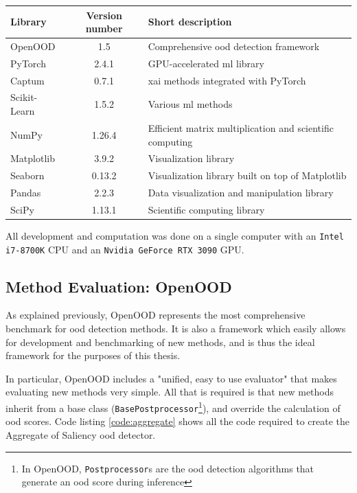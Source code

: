 \documentclass[UKenglish]{uiomasterthesis} %
\theoremstyle{definition}
\begin{document}
\begin{center}
    \begin{tabular}{ |l|c|l| } 
    \hline
    Library & Version number & Short description \\
    \hline
    OpenOOD & 1.5 & Comprehensive \ac{ood} detection framework \\ 
    PyTorch & 2.4.1 & GPU-accelerated \ac{ml} library \\ 
    Captum & 0.7.1 & \ac{xai} methods integrated with PyTorch \\ 
    Scikit-Learn & 1.5.2 & Various \ac{ml} methods \\ 
    NumPy & 1.26.4 & Efficient matrix multiplication and scientific computing \\ 
    Matplotlib & 3.9.2  & Visualization library \\ 
    Seaborn & 0.13.2 & Visualization library built on top of Matplotlib \\
    Pandas & 2.2.3 & Data visualization and manipulation library \\
    SciPy & 1.13.1 & Scientific computing library \\
    \hline
    \end{tabular}
\end{center}

All development and computation was done on a single computer with an \texttt{Intel i7-8700K} CPU and an \texttt{Nvidia GeForce RTX 3090} GPU.

\subsection{Method Evaluation: OpenOOD}

As explained previously, OpenOOD \cite{openood} represents the most comprehensive benchmark for \ac{ood} detection methods. It is also a framework which easily allows for development and benchmarking of new methods, and is thus the ideal framework for the purposes of this thesis.

In particular, OpenOOD includes a "unified, easy to use evaluator" \cite{openood15} that makes evaluating new methods very simple. All that is required is that new methods inherit from a base class (\texttt{BasePostprocessor}\footnote{In OpenOOD, \texttt{Postprocessor}s are the \ac{ood} detection algorithms that generate an \ac{ood} score during inference}), and override the calculation of \ac{ood} scores. Code listing \ref{code:aggregate} shows all the code required to create the Aggregate of Saliency \ac{ood} detector.
\end{document}
